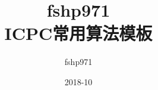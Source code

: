 \documentclass[twoside,openright]{book}
\title{fshp971 \\ ICPC常用算法模板}
\author{fshp971}
\affiliation{}
\date{2018-10}
\begin{document}
\makecomptitle

\maketoc








\end{document}
